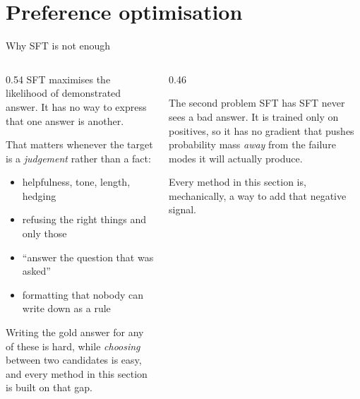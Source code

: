 \documentclass[aspectratio=169,10pt]{beamer}
\begin{document}
\section{Preference optimisation}

\begin{frame}[shrink=4]{Why SFT is not enough}
  \begin{columns}[T]
    \begin{column}{0.54\textwidth}
      SFT maximises the likelihood of  demonstrated answer. It has
      no way to express that one answer is  another.
      \vspace{0.6em}

      That matters whenever the target is a \emph{judgement} rather than a
      fact:
      \begin{itemize}
        \item helpfulness, tone, length, hedging
        \item refusing the right things and only those
        \item ``answer the question that was asked''
        \item formatting that nobody can write down as a rule
      \end{itemize}
      \vspace{0.4em}
      Writing the gold answer for any of these is hard, while \emph{choosing}
      between two candidates is easy, and every method in this section is
      built on that gap.
    \end{column}
    \begin{column}{0.46\textwidth}
      \begin{block}{The second problem SFT has}
        \small
        SFT never sees a bad answer. It is trained only on positives, so it
        has no gradient that pushes probability mass \emph{away} from the
        failure modes it will actually produce.
        \vspace{0.4em}

        Every method in this section is, mechanically, a way to add that
        negative signal.
      \end{block}
    \end{column}
  \end{columns}
\end{frame}
\end{document}
